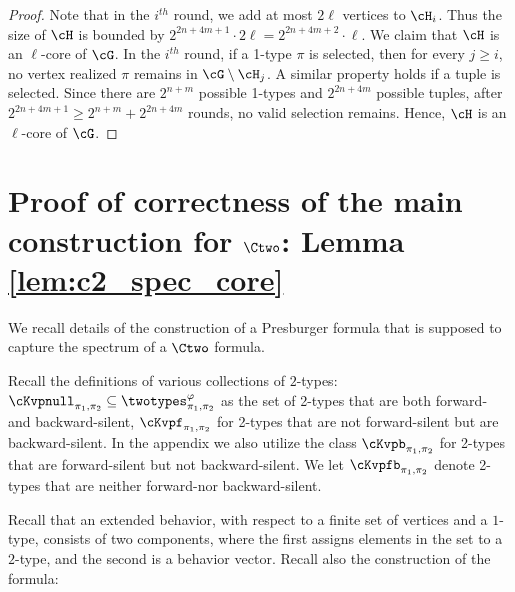 \begin{proof}
    Note that in the $i^{th}$ round, we add at most $2\ell$ vertices to $\cH_i$.
    Thus the size of $\cH$ is bounded by $2^{2n+4m+1} \cdot 2\ell = 2^{2n+4m+2} \cdot \ell$.
    We claim that $\cH$ is an $\ell$-core of $\cG$.
    In the $i^{th}$ round, if a 1-type $\pi$ is selected,
    then for every $j \ge i$,
    no vertex realized $\pi$ remains in $\cG \setminus \cH_j$.
    A similar property holds if a tuple is selected.
    Since there are $2^{n+m}$ possible 1-types and $2^{2n+4m}$ possible tuples,
    after $2^{2n+4m+1} \ge 2^{n+m} + 2^{2n+4m}$ rounds,
    no valid selection remains.
    Hence, $\cH$ is an $\ell$-core of $\cG$.
\end{proof}
\section*{Proof of correctness of the main construction for $\Ctwo$: Lemma \ref{lem:c2_spec_core}} \label{app:ctwoproof}

We recall details of
the construction of a Presburger formula that is supposed to capture the spectrum of a $\Ctwo$ formula.

Recall the definitions of various collections of $2$-types:
$\cKvpnull_{\pi_1, \pi_2} \subseteq \twotypes^\varphi_{\pi_1, \pi_2}$ as the set of 2-types that are both forward- and backward-silent,
$\cKvpf_{\pi_1, \pi_2}$ for 2-types that are not forward-silent but are backward-silent.
In the appendix we also utilize the class
$\cKvpb_{\pi_1, \pi_2}$ for 2-types that are forward-silent but not backward-silent. We let
$\cKvpfb_{\pi_1, \pi_2}$ denote 2-types that are neither forward-nor backward-silent.

Recall that an extended behavior, with respect to a finite set of vertices and a $1$-type, consists of two components, where the first assigns elements in the set to a $2$-type, and the second is a behavior vector. 
Recall also the construction of the formula:

